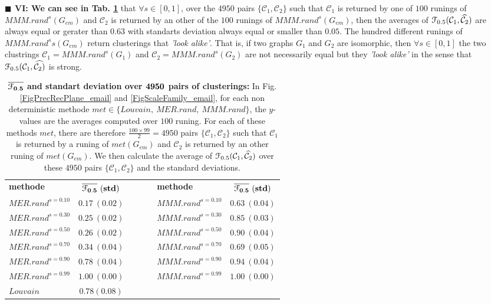 \documentclass[12pt]{article}
\theoremstyle{thmstyleone}%
\theoremstyle{definition}
\begin{document}
\noindent
{\bf $\blacksquare$ VI: We can see in Tab. \ref{tabcois}} that $\forall s \in [0,1]$, over the $4950$ pairs $\{\mathcal{C}_1, \mathcal{C}_2\}$ such that $\mathcal{C}_1$ is returned by one of $100$ runings of $MMM.rand^{s}(G_{em})$ and $\mathcal{C}_2$ is returned by an other of the $100$ runings of $MMM.rand^{s}(G_{em})$, then the averages of $\EuScript{F}_{0.5}(\mathcal{C}_1,\widehat{\mathcal{C}_2})$ are always equal or gerater than $0.63$ with standarts deviation always equal or smaller than $0.05$. The hundred different runings of $MMM.rand^{s}{s}(G_{em})$ return clusterings that {\it 'look alike'}.
That is, if two graphs $G_1$ and $G_2$ are isomorphic, then $\forall s \in [0,1]$ the two clustrings $\mathcal{C}_1=MMM.rand^{s}(G_1)$ and $\mathcal{C}_2=MMM.rand^{s}(G_2)$ are not necessarily equal but they {\it 'look alike'} in the sense that
$\EuScript{F}_{0.5}(\mathcal{C}_1,\widehat{\mathcal{C}_2)}$ is strong.

\begin{table}[!ht]
\centering
\begin{tabular}{| l  c | c | l  c |  }
  \cline{1-2} \cline{4-5}
  {\bf methode} & $\bf \stackrel{}{\overline{\EuScript{F}_{0.5}}~(std)}$ &~~~~& {\bf methode} & $\bf \stackrel{}{\overline{\EuScript{F}_{0.5}}~(std)}$  \\
  \cline{1-2} \cline{4-5}
  $MER.rand^{s=0.10}$& $0.17~(0.02)$ &~~~~& $MMM.rand^{s=0.10}$ & $0.63~(0.04)$\\
  \cline{1-2} \cline{4-5}
  $MER.rand^{s=0.30}$& $0.25~(0.02)$ &~~~~& $MMM.rand^{s=0.30}$ & $0.85~(0.03)$ \\
  \cline{1-2} \cline{4-5}
  $MER.rand^{s=0.50}$& $0.26~(0.02)$ &~~~~& $MMM.rand^{s=0.50}$ & $0.90~(0.04)$ \\
  \cline{1-2} \cline{4-5}
  $MER.rand^{s=0.70}$& $0.34~(0.04)$ &~~~~& $MMM.rand^{s=0.70}$ & $0.69~(0.05)$ \\
  \cline{1-2} \cline{4-5}
  $MER.rand^{s=0.90}$& $0.78~(0.04)$ &~~~~& $MMM.rand^{s=0.90}$ & $0.94~(0.04)$ \\
  \cline{1-2} \cline{4-5}
  $MER.rand^{s=0.99}$& $1.00~(0.00)$ &~~~~& $MMM.rand^{s=0.99}$ & $1.00~(0.00)$ \\
  \cline{1-2} \cline{4-5}
  $Louvain$& $0.78(0.08)$& \multicolumn{3}{c}{}\\
  \cline{1-2}
\end{tabular}
\bigskip
    \caption{{\bf $\bf \overline{\EuScript{F}_{0.5}}$ and standart deviation over $\bf 4950$ pairs of clusterings:} In Fig. \ref{FigPrecRecPlane_email} and \ref{FigScaleFamily_email}, for each non deterministic methode $met \in \{Louvain,~MER.rand,~ MMM.rand\}$,
    the $y$-values are the averages computed over $100$ runing.
    For each of these methods $met$, there are therefore $\frac{100\times99}{2}=4950$ pairs $\{\mathcal{C}_1, \mathcal{C}_2\}$ such that $\mathcal{C}_1$ is returned by a runing of $met(G_{em})$ and $\mathcal{C}_2$ is returned by an other runing of $met(G_{em})$. We then calculate the average of $\EuScript{F}_{0.5}(\mathcal{C}_1,\widehat{\mathcal{C}_2})$ over these $4950$ pairs $\{\mathcal{C}_1, \mathcal{C}_2\}$ and the standard deviations. \label{tabcois}}
\end{table}
\end{document}
